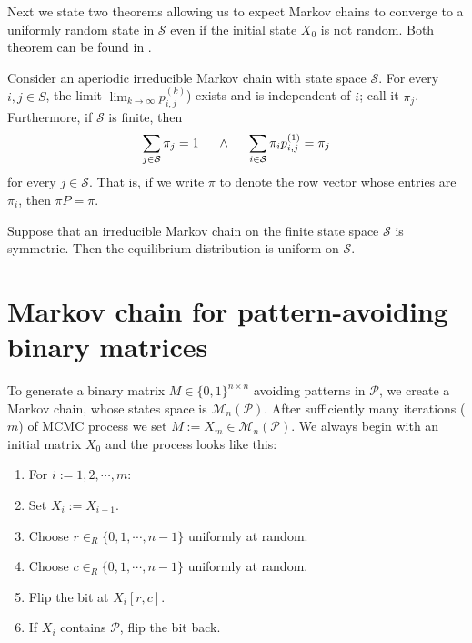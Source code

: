 Next we state two theorems allowing us to expect Markov chains to converge to a uniformly random state in $\mathcal{S}$ even if the initial state $X_0$ is not random. Both theorem can be found in \cite{Madras}.
\begin{thm}
Consider an aperiodic irreducible Markov chain with state space $\mathcal{S}$. For every $i,j\in S$, the limit $\lim_{k\rightarrow\infty}p_{i,j}^{(k)}$) exists and is independent of $i$; call it $\pi_j$. Furthermore, if $\mathcal{S}$ is finite, then
$$\sum\limits_{j\in\mathcal{S}}\pi_j=1\hspace{5mm}\wedge\hspace{5mm}\sum\limits_{i\in\mathcal{S}}\pi_ip_{i,j}^{(1)}=\pi_j$$
for every $j\in\mathcal{S}$. That is, if we write $\pi$ to denote the row vector whose entries are $\pi_i$, then $\pi P=\pi$.
\end{thm}
\begin{thm}
Suppose that an irreducible Markov chain on the finite state space $\mathcal{S}$ is symmetric. Then the equilibrium distribution is uniform on $\mathcal{S}$.
\end{thm}

\section{Markov chain for pattern-avoiding binary matrices}
\label{sect:mmcmc}
To generate a binary matrix $M\in\{0,1\}^{n\times n}$ avoiding patterns in $\mathcal{P}$, we create a Markov chain, whose states space is $\mathcal{M}_n(\mathcal{P})$. After sufficiently many iterations ($m$) of MCMC process we set $M:=X_m\in\mathcal{M}_n(\mathcal{P})$. We always begin with an initial matrix $X_0$ and the process looks like this:
\begin{enumerate}
\item For $i:=1,2,\cdots,m$:
\item \hspace{5mm} Set $X_{i}:=X_{i-1}$.
\item \hspace{5mm} Choose $r\in_R\{0,1,\cdots,n-1\}$ uniformly at random.
\item \hspace{5mm} Choose $c\in_R\{0,1,\cdots,n-1\}$ uniformly at random.
\item \hspace{5mm} Flip the bit at $X_{i}[r,c]$.
\item \hspace{5mm} If $X_{i}$ contains $\mathcal{P}$, flip the bit back.
\end{enumerate}

